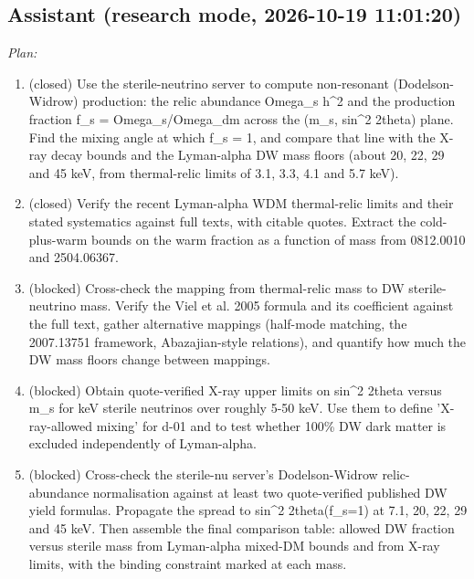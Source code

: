 \documentclass[11pt,a4paper]{article}
\begin{document}
\subsection*{Assistant \small(research mode, 2026-10-19 11:01:20)}
\textit{Plan:}\begin{enumerate}
  \item (closed) Use the sterile-neutrino server to compute non-resonant (Dodelson-Widrow) production: the relic abundance Omega\_s h\textasciicircum{}2 and the production fraction f\_s = Omega\_s/Omega\_dm across the (m\_s, sin\textasciicircum{}2 2theta) plane. Find the mixing angle at which f\_s = 1, and compare that line with the X-ray decay bounds and the Lyman-alpha DW mass floors (about 20, 22, 29 and 45 keV, from thermal-relic limits of 3.1, 3.3, 4.1 and 5.7 keV).
  \item (closed) Verify the recent Lyman-alpha WDM thermal-relic limits and their stated systematics against full texts, with citable quotes. Extract the cold-plus-warm bounds on the warm fraction as a function of mass from 0812.0010 and 2504.06367.
  \item (blocked) Cross-check the mapping from thermal-relic mass to DW sterile-neutrino mass. Verify the Viel et al. 2005 formula and its coefficient against the full text, gather alternative mappings (half-mode matching, the 2007.13751 framework, Abazajian-style relations), and quantify how much the DW mass floors change between mappings.
  \item (blocked) Obtain quote-verified X-ray upper limits on sin\textasciicircum{}2 2theta versus m\_s for keV sterile neutrinos over roughly 5-50 keV. Use them to define 'X-ray-allowed mixing' for d-01 and to test whether 100\% DW dark matter is excluded independently of Lyman-alpha.
  \item (blocked) Cross-check the sterile-nu server's Dodelson-Widrow relic-abundance normalisation against at least two quote-verified published DW yield formulas. Propagate the spread to sin\textasciicircum{}2 2theta(f\_s=1) at 7.1, 20, 22, 29 and 45 keV. Then assemble the final comparison table: allowed DW fraction versus sterile mass from Lyman-alpha mixed-DM bounds and from X-ray limits, with the binding constraint marked at each mass.
\end{enumerate}
\end{document}
